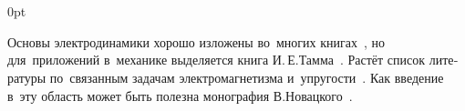 \section*{\small \wordforbibliography}

\begin{changemargin}{\parindent}{0pt}
\fontsize{10}{12}\selectfont

\begin{otherlanguage}{russian}

Основы электродинамики хорошо изложены во~многих книгах~\cite{classicalelectrodynamics, feynman-lecturesonphysics}, но для~приложений в~механике выделяется книга И.\,Е.\;Тамма~\cite{tamm-electricity}.
Растёт список литературы по~связанным задачам электромагнетизма и~упругости~\cite{parton-electromagneticelasticity, podstrigach.burak.kondrat-magnetothermoelasticity}.
Как введение в~эту область может быть полезна монография В.\;Новацкого~\cite{nowacki-electromagneticeffects}.

\end{otherlanguage}

\end{changemargin}
